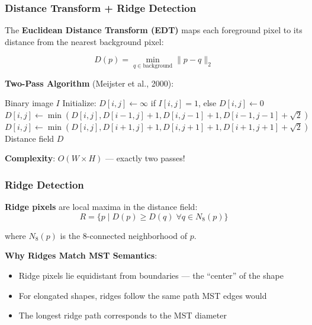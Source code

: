 \documentclass[11pt]{article}
\begin{document}
\subsubsection{Distance Transform + Ridge Detection}

The \textbf{Euclidean Distance Transform (EDT)} maps each foreground pixel to its distance from the nearest background pixel:

\begin{equation}
    D(p) = \min_{q \in \text{background}} \|p - q\|_2
\end{equation}

\textbf{Two-Pass Algorithm} (Meijster et al., 2000):
\begin{algorithm}[H]
\caption{Euclidean Distance Transform}
\begin{algorithmic}[1]
\Require Binary image $I$
\State Initialize: $D[i,j] \gets \infty$ if $I[i,j] = 1$, else $D[i,j] \gets 0$
        \State $D[i,j] \gets \min(D[i,j], D[i-1,j]+1, D[i,j-1]+1, D[i-1,j-1]+\sqrt{2})$
    \EndFor
\EndFor
{}
        \State $D[i,j] \gets \min(D[i,j], D[i+1,j]+1, D[i,j+1]+1, D[i+1,j+1]+\sqrt{2})$
    \EndFor
\EndFor
\State \Return Distance field $D$
\end{algorithmic}
\end{algorithm}

\textbf{Complexity}: $O(W \times H)$ — exactly two passes!

\subsubsection{Ridge Detection}

\textbf{Ridge pixels} are local maxima in the distance field:
\begin{equation}
    R = \{p \mid D(p) \geq D(q) \; \forall q \in N_8(p)\}
\end{equation}

where $N_8(p)$ is the 8-connected neighborhood of $p$.

\textbf{Why Ridges Match MST Semantics}:
\begin{itemize}
    \item Ridge pixels lie equidistant from boundaries — the ``center'' of the shape
    \item For elongated shapes, ridges follow the same path MST edges would
    \item The longest ridge path corresponds to the MST diameter
\end{itemize}
\end{document}

